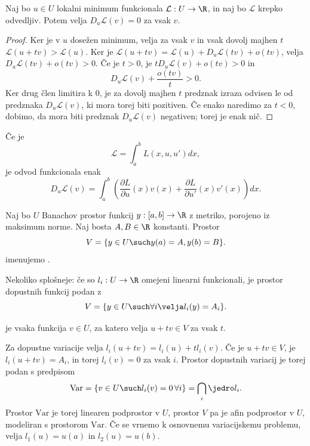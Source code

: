 
\begin{trditev}
  Naj bo $u \in U$ lokalni minimum funkcionala $\mathcal{L} : U \to \R$, in naj
  bo $\mathcal{L}$ krepko odvedljiv.
  Potem velja $D_u \mathcal{L}(v) = 0$ za vsak $v$.
\end{trditev}

\begin{proof}
  Ker je v $u$ dosežen minimum, velja za vsak $v$ in vsak dovolj majhen $t$
  $\mathcal{L}(u + tv) > \mathcal{L}(u)$.
  Ker je $\mathcal{L}(u+tv) = \mathcal{L}(u) + D_u \mathcal{L}(tv) + o(tv)$,
  velja $D_u \mathcal{L}(tv) + o(tv) > 0$.
  Če je $t > 0$, je $t D_u \mathcal{L}(v) + o(tv) > 0$ in
  \[
	D_u \mathcal{L}(v) + \frac{o(tv)}{t} > 0.
  \]
  Ker drug člen limitira k $0$, je za dovolj majhen $t$ predznak izraza odvisen
  le od predznaka $D_u \mathcal{L}(v)$, ki mora torej biti pozitiven.
  Če enako naredimo za $t < 0$, dobimo, da mora biti predznak $D_u
  \mathcal{L}(v)$ negativen; torej je enak nič.
\end{proof}


Če je
\[
  \mathcal{L} = \int_a^b L(x, u, u') dx,
\]
je odvod funkcionala enak
\[
  D_u \mathcal{L}(v)
  = \int_a^b \left( \frac{\partial L}{\partial u}(x) v(x) +
	\frac{\partial L}{\partial u'}(x) v'(x) \right) dx.
\]

\begin{definicija}
  Naj bo $U$ Banachov prostor funkcij $y: [a,b] \to \R$ z metriko, porojeno iz
  maksimum norme.
  Naj bosta $A, B \in \R$ konstanti.
  Prostor
  \[
	V = \{y \in U \such y(a) = A, y(b) = B\}.
  \]
  imenujemo .
\end{definicija}

Nekoliko splošneje: če so $l_i : U \to \R$ omejeni linearni funkcionali, je
prostor dopustnih funkcij podan z
\[
  V = \{y \in U \such \forall i \velja l_i(y) = A_i\}.
\]

\begin{definicija}
   je vsaka funkcija $v \in U$, za katero velja $u +
  tv \in V$ za vsak $t$.
\end{definicija}

Za dopustne variacije velja $l_i(u+tv) = l_i(u) + t l_i(v)$.
Če je $u + tv \in V$, je $l_i(u+tv) = A_i$, in torej $l_i(v) = 0$ za vsak $i$.
Prostor dopustnih variacij je torej podan s predpisom
\[
  \text{Var} = \{ v \in U \such l_i(v) = 0\,\forall i \} = \bigcap_i \jedro l_i.
\]
Prostor $\text{Var}$ je torej linearen podprostor v $U$, prostor $V$ pa je afin
podprostor v $U$, modeliran s prostorom $\text{Var}$.
Če se vrnemo k osnovnemu variacijskemu problemu, velja $l_1(u) = u(a)$ in
$l_2(u) = u(b)$.

